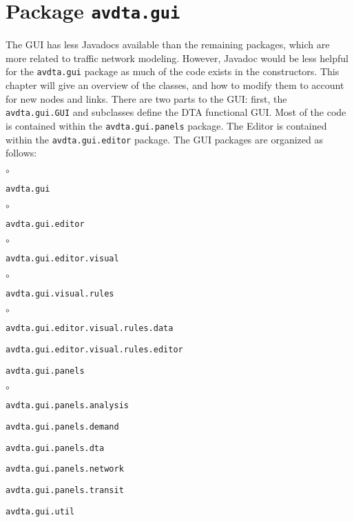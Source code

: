 \chapter{Package \texttt{avdta.gui}}

The GUI has less Javadocs available than the remaining packages, which are more related to traffic network modeling. However, Javadoc would be less helpful for the \texttt{avdta.gui} package as much of the code exists in the constructors. This chapter will give an overview of the classes, and how to modify them to account for new nodes and links. There are two parts to the GUI: first, the \texttt{avdta.gui.GUI} and subclasses define the DTA functional GUI. Most of the code is contained within the \texttt{avdta.gui.panels} package. The Editor is contained within the \texttt{avdta.gui.editor} package. 
%
The GUI packages are organized as follows:
\begin{list}{$\circ$}{}
	\item \texttt{avdta.gui}
	
	\begin{list}{$\circ$}{}
		\item \texttt{avdta.gui.editor}
		
		\begin{list}{$\circ$}{}
			\item \texttt{avdta.gui.editor.visual}
			
			\begin{list}{$\circ$}{}
				\item \texttt{avdta.gui.visual.rules}
				
				\begin{list}{$\circ$}{}
					\item \texttt{avdta.gui.editor.visual.rules.data}
					\item \texttt{avdta.gui.editor.visual.rules.editor}
				\end{list}
			\end{list}
		\end{list}
		
		\item \texttt{avdta.gui.panels}
		
		\begin{list}{$\circ$}{}
			\item \texttt{avdta.gui.panels.analysis}
			\item \texttt{avdta.gui.panels.demand}
			\item \texttt{avdta.gui.panels.dta}
			\item \texttt{avdta.gui.panels.network}
			\item \texttt{avdta.gui.panels.transit}
		\end{list}
		
		\item \texttt{avdta.gui.util}
	\end{list}
	
\end{list}
